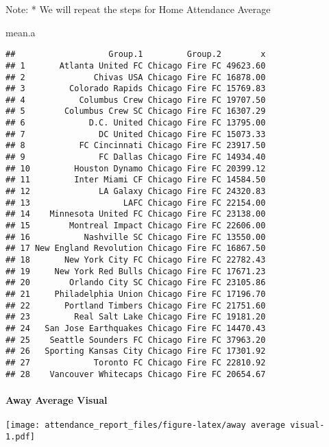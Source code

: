 \documentclass[
]{article}
\newenvironment{Shaded}{\begin{snugshade}}{\end{snugshade}}
\newcommand{\NormalTok}[1]{#1}
\begin{document}
Note: * We will repeat the steps for Home Attendance Average

\begin{Shaded}
\begin{Highlighting}[]
\NormalTok{mean.a}
\end{Highlighting}
\end{Shaded}

\begin{verbatim}
##                   Group.1         Group.2        x
## 1       Atlanta United FC Chicago Fire FC 49623.60
## 2              Chivas USA Chicago Fire FC 16878.00
## 3         Colorado Rapids Chicago Fire FC 15769.83
## 4           Columbus Crew Chicago Fire FC 19707.50
## 5        Columbus Crew SC Chicago Fire FC 16307.29
## 6             D.C. United Chicago Fire FC 13795.00
## 7               DC United Chicago Fire FC 15073.33
## 8           FC Cincinnati Chicago Fire FC 23917.50
## 9               FC Dallas Chicago Fire FC 14934.40
## 10         Houston Dynamo Chicago Fire FC 20399.12
## 11         Inter Miami CF Chicago Fire FC 14584.50
## 12              LA Galaxy Chicago Fire FC 24320.83
## 13                   LAFC Chicago Fire FC 22154.00
## 14    Minnesota United FC Chicago Fire FC 23138.00
## 15        Montreal Impact Chicago Fire FC 22606.00
## 16           Nashville SC Chicago Fire FC 13550.00
## 17 New England Revolution Chicago Fire FC 16867.50
## 18       New York City FC Chicago Fire FC 22782.43
## 19     New York Red Bulls Chicago Fire FC 17671.23
## 20        Orlando City SC Chicago Fire FC 23105.86
## 21     Philadelphia Union Chicago Fire FC 17196.70
## 22       Portland Timbers Chicago Fire FC 21751.60
## 23         Real Salt Lake Chicago Fire FC 19181.20
## 24   San Jose Earthquakes Chicago Fire FC 14470.43
## 25    Seattle Sounders FC Chicago Fire FC 37963.20
## 26   Sporting Kansas City Chicago Fire FC 17301.92
## 27             Toronto FC Chicago Fire FC 22810.92
## 28    Vancouver Whitecaps Chicago Fire FC 20654.67
\end{verbatim}

\hypertarget{away-average-visual}{%
\paragraph{Away Average Visual}\label{away-average-visual}}

\texttt{[image: attendance\_report\_files/figure-latex/away average visual-1.pdf]}
\end{document}
